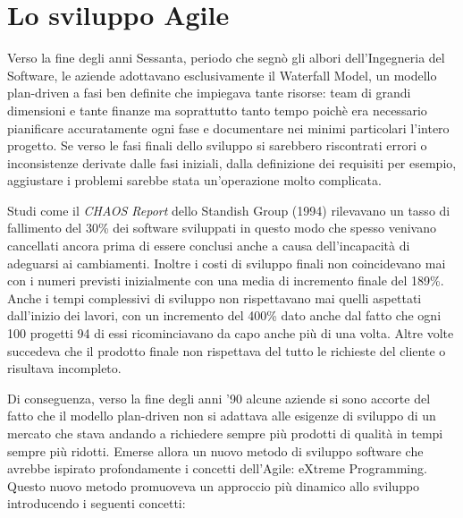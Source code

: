 \documentclass[target=bach,aauheader=,style=]{thud}
\begin{document}
\section{Lo sviluppo Agile}
Verso la fine degli anni Sessanta, periodo che segnò gli albori dell'Ingegneria del Software, le aziende adottavano esclusivamente il Waterfall Model,
un modello plan-driven a fasi ben definite che impiegava tante risorse: team di grandi dimensioni e tante finanze ma soprattutto tanto tempo
poichè era necessario pianificare accuratamente ogni fase e documentare nei minimi particolari l'intero progetto. Se verso le fasi finali dello
sviluppo si sarebbero riscontrati errori o inconsistenze derivate dalle fasi iniziali, dalla definizione dei requisiti per esempio, aggiustare i
problemi sarebbe stata un'operazione molto complicata.
\par Studi come il \textit{CHAOS Report}\cite{standish1994chaos} dello Standish Group (1994) rilevavano un tasso di fallimento del 30\% dei software
sviluppati in questo modo che spesso venivano cancellati ancora prima di essere conclusi anche a causa dell'incapacità di adeguarsi ai cambiamenti.
Inoltre i costi di sviluppo finali non coincidevano mai con i numeri previsti inizialmente con una media di incremento finale del 189\%.
Anche i tempi complessivi di sviluppo non rispettavano mai quelli aspettati dall'inizio dei lavori, con un incremento del 400\% dato anche dal
fatto che ogni 100 progetti 94 di essi ricominciavano da capo anche più di una volta.
Altre volte succedeva che il prodotto finale non rispettava del tutto le richieste del cliente o risultava incompleto.
\par Di conseguenza, verso la fine degli anni '90 alcune aziende si sono accorte del fatto che il modello plan-driven non si adattava alle esigenze di sviluppo di un
mercato che stava andando a richiedere sempre più prodotti di qualità in tempi sempre più ridotti.
Emerse allora un nuovo metodo di sviluppo software che avrebbe ispirato profondamente i concetti dell'Agile: eXtreme Programming.
Questo nuovo metodo promuoveva un approccio più dinamico allo sviluppo introducendo i seguenti concetti:
\end{document}
